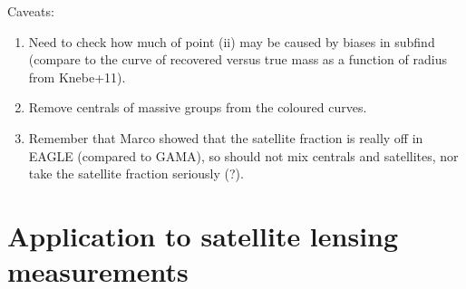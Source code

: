 \documentclass[usenatbib,fleqn]{mnras}
\begin{document}
Caveats:
\begin{enumerate}
 \item Need to check how much of point (ii) may be caused by biases in subfind (compare to the curve of recovered versus true mass as a function of radius from Knebe+11).
 \item Remove centrals of massive groups from the coloured curves.
 \item Remember that Marco showed that the satellite fraction is really off in EAGLE (compared to GAMA), so should not mix centrals and satellites, nor take the satellite fraction seriously (?).
\end{enumerate}


\section{Application to satellite lensing measurements}




\end{document}
